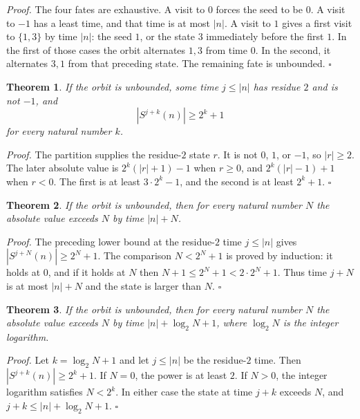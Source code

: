 \documentclass[11pt,letterpaper]{article}
\newtheorem{theorem}{Theorem}
\newenvironment{proof}{\noindent\textit{Proof.}}{\hfill\(\square\)}
\begin{document}
\begin{proof}
The four fates are exhaustive. A visit to \(0\) forces the seed to be \(0\). A visit to \(-1\) has a least time, and that time is at most \(|n|\). A visit to \(1\) gives a first visit to \(\{1,3\}\) by time \(|n|\): the seed \(1\), or the state \(3\) immediately before the first \(1\). In the first of those cases the orbit alternates \(1,3\) from time \(0\). In the second, it alternates \(3,1\) from that preceding state. The remaining fate is unbounded.
\end{proof}

\begin{theorem}
\label{thm:escape}
If the orbit is unbounded, some time \(j\le |n|\) has residue \(2\) and is not \(-1\), and
\[
|S^{j+k}(n)|\ge 2^{k}+1
\]
for every natural number \(k\).
\end{theorem}

\begin{proof}
The partition supplies the residue-\(2\) state \(r\). It is not \(0\), \(1\), or \(-1\), so \(|r|\ge 2\). The later absolute value is \(2^{k}(|r|+1)-1\) when \(r\ge 0\), and \(2^{k}(|r|-1)+1\) when \(r<0\). The first is at least \(3\cdot 2^{k}-1\), and the second is at least \(2^{k}+1\).
\end{proof}

\begin{theorem}
\label{thm:escapetime}
If the orbit is unbounded, then for every natural number \(N\) the absolute value exceeds \(N\) by time \(|n|+N\).
\end{theorem}

\begin{proof}
The preceding lower bound at the residue-\(2\) time \(j\le |n|\) gives \(|S^{j+N}(n)|\ge 2^{N}+1\). The comparison \(N<2^{N}+1\) is proved by induction: it holds at \(0\), and if it holds at \(N\) then \(N+1\le 2^{N}+1<2\cdot 2^{N}+1\). Thus time \(j+N\) is at most \(|n|+N\) and the state is larger than \(N\).
\end{proof}

\begin{theorem}
\label{thm:escapelog}
If the orbit is unbounded, then for every natural number \(N\) the absolute value exceeds \(N\) by time \(|n|+\log_{2}N+1\), where \(\log_{2}N\) is the integer logarithm.
\end{theorem}

\begin{proof}
Let \(k=\log_{2}N+1\) and let \(j\le |n|\) be the residue-\(2\) time. Then \(|S^{j+k}(n)|\ge 2^{k}+1\). If \(N=0\), the power is at least \(2\). If \(N>0\), the integer logarithm satisfies \(N<2^{k}\). In either case the state at time \(j+k\) exceeds \(N\), and \(j+k\le |n|+\log_{2}N+1\).
\end{proof}
\end{document}
